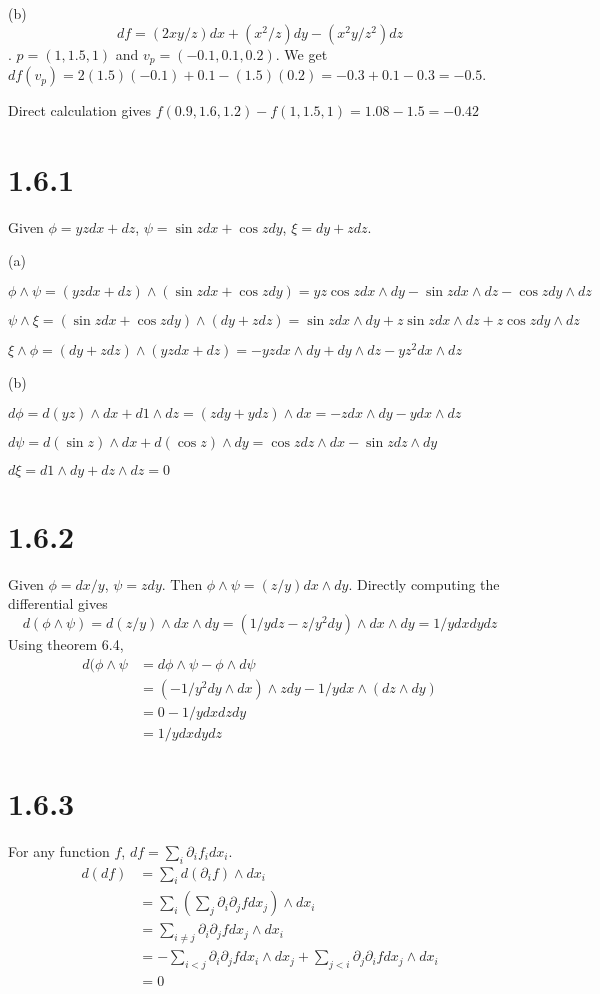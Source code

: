 \documentclass[12pt]{article}
\begin{document}
(b) $$df = (2xy/z) dx + (x^2/z) dy - (x^2y/z^2)dz$$. $p = (1,1.5,1)$ and $v_p=(-0.1, 0.1, 0.2)$.
We get $df(v_p) = 2(1.5)(-0.1) +0.1 - (1.5)(0.2) =-0.3 + 0.1 - 0.3 = -0.5$. 

Direct calculation gives $f(0.9, 1.6, 1.2) - f(1, 1.5, 1) = 1.08 - 1.5 = -0.42$

\section*{1.6.1}
Given $\phi = yzdx + dz$, $\psi = \sin zdx + \cos zdy$, $\xi = dy+zdz$.

(a)

 $\phi \wedge \psi = (yzdx + dz) \wedge ( \sin zdx + \cos zdy) = yz\cos z dx \wedge dy - \sin z dx \wedge dz - \cos z dy \wedge dz $

$ \psi \wedge \xi = (\sin zdx + \cos zdy) \wedge ( dy+zdz)  = \sin z dx \wedge dy + z \sin z dx \wedge dz + z \cos z dy \wedge dz $

$ \xi \wedge \phi = ( dy+zdz) \wedge ( yzdx + dz) = -yzdx \wedge dy + dy \wedge dz - yz^2 dx \wedge dz$

(b)

 $d\phi = d(yz)\wedge dx + d1 \wedge dz = (zdy + ydz)\wedge dx = -z dx \wedge dy - y dx \wedge dz$
 
 $d\psi = d(\sin z) \wedge dx + d(\cos z) \wedge dy = \cos z dz \wedge dx - \sin z dz \wedge dy$
 
 $d\xi = d1 \wedge dy+dz \wedge dz = 0$
 
\section*{1.6.2}
Given $\phi = dx /y $, $\psi = z dy$. Then $\phi \wedge \psi = (z/y) dx \wedge dy$. Directly computing the differential gives $$d(\phi \wedge \psi) = d(z/y) \wedge dx \wedge dy = (1/y dz - z/y^2 dy) \wedge dx \wedge dy = 1/y dx dy dz$$ Using theorem 6.4, 
$$ \begin{aligned}
	d(\phi \wedge \psi &= d\phi \wedge \psi - \phi \wedge d\psi \\
	  &= (- 1/y^2 dy \wedge dx) \wedge zdy - 1/y dx \wedge (dz \wedge dy) \\
	  &= 0 - 1/y dx dz dy \\
	  &= 1/y dx dy dz
\end{aligned}$$ 

\section*{1.6.3}
For any function $f$,  $df = \sum_i \partial_i f_i dx_i$. 
$$
  \begin{aligned}
  	d(df) &= \sum_i d(\partial_i f) \wedge dx_i  \\
  		  &= \sum_i (\sum_j \partial_i \partial_j f dx_j) \wedge dx_i \\
  		  &= \sum_{i\neq j} \partial_i \partial_j f dx_j \wedge dx_i \\
  		  &= - \sum_{i < j} \partial_i \partial_j f dx_i \wedge dx_j + \sum_{j < i} \partial_j \partial_i f dx_j \wedge dx_i \\
  		  &= 0
  \end{aligned}
$$
\end{document}
